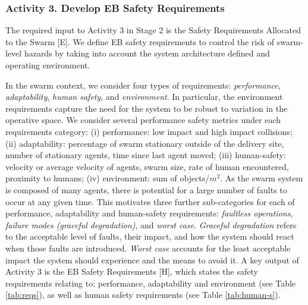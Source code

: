 \documentclass[runningheads]{llncs}
\begin{document}
\subsubsection*{Activity 3. Develop EB Safety Requirements}

The required input to Activity 3 in Stage 2 is the Safety Requirements Allocated to the Swarm [E]. 
We define EB safety requirements to control the risk of swarm-level hazards by taking into account the system architecture defined and operating environment. 

In the swarm context, we consider four types of requirements: \emph{performance}, \emph{adaptability}, \emph{human safety}, and \emph{environment}. 
In particular, the environment requirements capture the need for the system to be robust to variation in the operative space.
We consider several performance safety metrics under each requirements category: 
(i) performance: low impact and high impact collisions; 
(ii) adaptability: percentage of swarm stationary outside of the delivery site, number of stationary agents, time since last agent moved; 
(iii) human-safety: velocity or average velocity of agents, swarm size, rate of human encountered, proximity to humans;
(iv) environment: sum of objects/$m^2$.
As the swarm system is composed of many agents, there is potential for a large number of faults to occur at any given time. This motivates three further sub-categories for each of performance, adaptability and human-safety requirements: \emph{faultless operations}, \emph{failure modes (graceful degradation)}, and \emph{worst case}. 
\emph{Graceful degradation} refers to the acceptable level of faults, their impact, and how the system should react when those faults are introduced. \emph{Worst case} accounts for the least acceptable impact the system should experience and the means to avoid it. 
A key output of Activity 3 is the EB Safety Requirements [H], which states the safety requirements relating to: performance, adaptability and environment (see Table \ref{tab:reqs}), as well as human safety requirements (see Table \ref{tab:human-s}).
\end{document}
